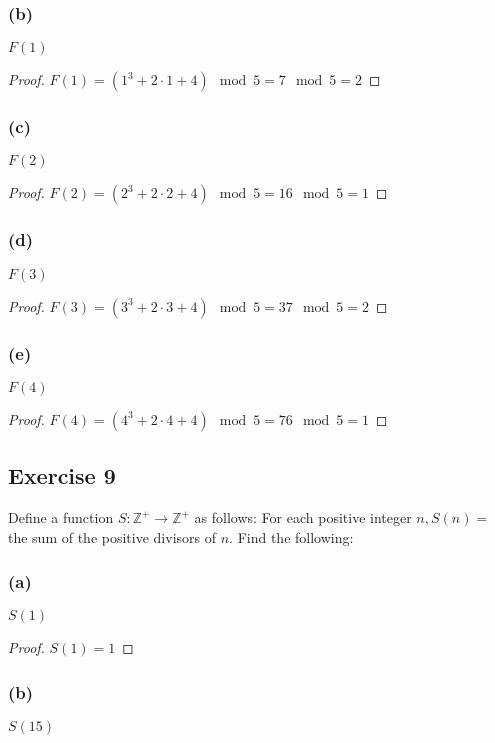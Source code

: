 \documentclass[14pt]{extarticle}
\newcommand{\Z}{\mathbb{Z}}
\begin{document}
\subsubsection{(b)}
$F(1)$

\begin{proof}
    \(F(1) = (1^3 + 2 \cdot 1 + 4) \mod 5 = 7 \mod 5 = 2\)
\end{proof}

\subsubsection{(c)}
$F(2)$

\begin{proof}
    \(F(2) = (2^3 + 2 \cdot 2 + 4) \mod 5 = 16 \mod 5 = 1\)
\end{proof}

\subsubsection{(d)}
$F(3)$

\begin{proof}
    \(F(3) = (3^3 + 2 \cdot 3 + 4) \mod 5 = 37 \mod 5 = 2\)
\end{proof}

\subsubsection{(e)}
$F(4)$

\begin{proof}
    \(F(4) = (4^3 + 2 \cdot 4 + 4) \mod 5 = 76 \mod 5 = 1\)
\end{proof}

\subsection{Exercise 9}
Define a function \(S: \Z^+ \to \Z^+\) as follows: For each positive integer \(n, S(n) =\) the sum of the positive
divisors of $n$. Find the following:

\subsubsection{(a)}
$S(1)$

\begin{proof}
    $S(1) = 1$

\end{proof}

\subsubsection{(b)}
$S(15)$
\end{document}
